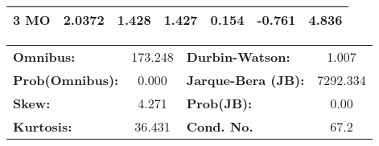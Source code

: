 \begin{center}
\begin{tabular}{lcccccc}
\textbf{3 MO}      &       2.0372  &        1.428     &     1.427  &         0.154        &       -0.761    &        4.836     \\
\bottomrule
\end{tabular}
\begin{tabular}{lclc}
\textbf{Omnibus:}       & 173.248 & \textbf{  Durbin-Watson:     } &    1.007  \\
\textbf{Prob(Omnibus):} &   0.000 & \textbf{  Jarque-Bera (JB):  } & 7292.334  \\
\textbf{Skew:}          &   4.271 & \textbf{  Prob(JB):          } &     0.00  \\
\textbf{Kurtosis:}      &  36.431 & \textbf{  Cond. No.          } &     67.2  \\
\bottomrule
\end{tabular}
\end{center}

